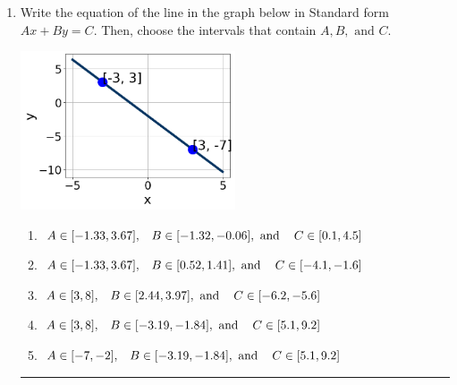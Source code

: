 \documentclass[14pt]{extbook}
\newcommand{\litem}[1]{\item#1\hspace*{-1cm}\rule{\textwidth}{0.4pt}}
\begin{document}
\begin{enumerate}
{\begin{enumerate}[label=\Alph*.]
\end{enumerate} }
\litem{
Write the equation of the line in the graph below in Standard form $Ax+By=C$. Then, choose the intervals that contain $A, B, \text{ and } C$.
\begin{center}
    \includegraphics[width=0.5\textwidth]{../Figures/linearGraphToStandardCopyC.png}
\end{center}
\begin{enumerate}[label=\Alph*.]
\item \( A \in [-1.33, 3.67], \hspace{3mm} B \in [-1.32, -0.06], \text{ and } \hspace{3mm} C \in [0.1, 4.5] \)
\item \( A \in [-1.33, 3.67], \hspace{3mm} B \in [0.52, 1.41], \text{ and } \hspace{3mm} C \in [-4.1, -1.6] \)
\item \( A \in [3, 8], \hspace{3mm} B \in [2.44, 3.97], \text{ and } \hspace{3mm} C \in [-6.2, -5.6] \)
\item \( A \in [3, 8], \hspace{3mm} B \in [-3.19, -1.84], \text{ and } \hspace{3mm} C \in [5.1, 9.2] \)
\item \( A \in [-7, -2], \hspace{3mm} B \in [-3.19, -1.84], \text{ and } \hspace{3mm} C \in [5.1, 9.2] \)


\end{enumerate}}
\end{enumerate}
\end{document}
